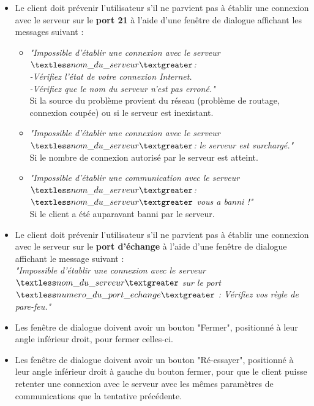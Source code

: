 \documentclass[10pt,a4paper]{report}
\begin{document}
\begin{itemize}[label = $\triangleright$]
\item Le client doit prévenir l'utilisateur s'il ne parvient pas à établir une connexion avec le serveur sur le \textbf{port 21} à l'aide d'une fenêtre de dialogue affichant les messages suivant : 

\begin{itemize}
\item \textit{"Impossible d'établir une connexion avec le serveur $\textless nom\_du\_serveur\textgreater$:\\
-Vérifiez l'état de votre connexion Internet.\\
-Vérifiez que le nom du serveur n'est pas erroné."\\}
Si la source du problème provient du réseau (problème de routage, connexion coupée) ou si le serveur est inexistant.

\item \textit{"Impossible d'établir une connexion avec le serveur $\textless nom\_du\_serveur\textgreater$: le serveur est surchargé."\\}
Si le nombre de connexion autorisé par le serveur est atteint.

\item \textit{"Impossible d'établir une communication avec le serveur $\textless nom\_du\_serveur\textgreater$:\\
$\textless nom\_du\_serveur\textgreater$ vous a banni !"\\}
Si le client a été auparavant banni par le serveur. 
\end{itemize}

\item Le client doit prévenir l'utilisateur s'il ne parvient pas à établir une connexion avec le serveur sur le \textbf{port d'échange} à l'aide d'une fenêtre de dialogue affichant le message suivant : \\
\textit{"Impossible d'établir une connexion avec le serveur $\textless nom\_du\_serveur\textgreater$ sur le port $\textless numero\_du\_port\_echange\textgreater$ : Vérifiez vos règle de pare-feu."\\}

\item Les fenêtre de dialogue doivent avoir un bouton "Fermer", positionné à leur angle inférieur droit, pour fermer celles-ci.

\item Les fenêtre de dialogue doivent avoir un bouton "Ré-essayer", positionné à leur angle inférieur droit à gauche du bouton fermer, pour que le client puisse retenter une connexion avec le serveur avec les mêmes paramètres de communications que la tentative précédente.

\end{itemize}
\end{document}
